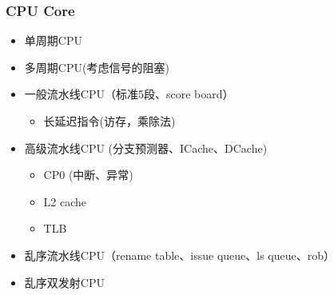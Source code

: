 \documentclass[lang=cn,11pt,a4paper]{elegantpaper}
\begin{document}
\subsubsection{CPU Core}
\begin{itemize}
\item 单周期CPU
\item 多周期CPU(考虑信号的阻塞)
\item 一般流水线CPU（标准5段、score board）
\begin{itemize}
\item 长延迟指令(访存，乘除法)
\end{itemize}
\item 高级流水线CPU (分支预测器、ICache、DCache)
\begin{itemize}
\item CP0 (中断、异常)
\item L2 cache
\item TLB
\end{itemize}
\item 乱序流水线CPU（rename table、issue queue、ls queue、rob）
\item 乱序双发射CPU
\end{itemize}
\end{document}
